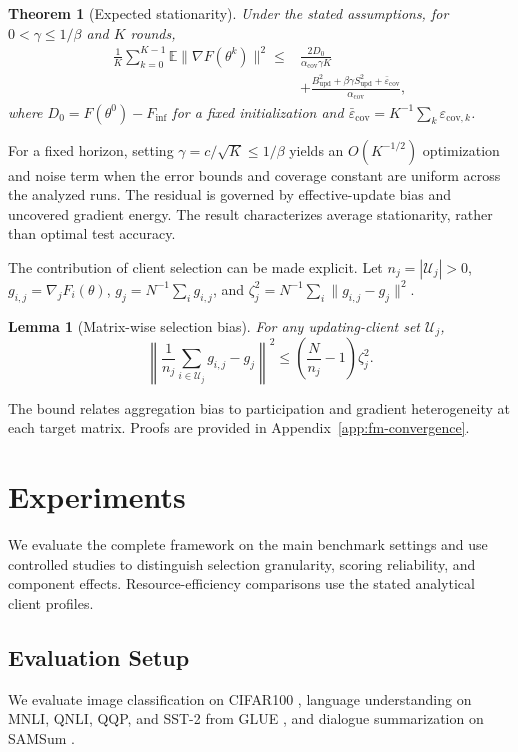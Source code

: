 \documentclass[10pt,conference,letterpaper]{IEEEtran}
\newtheorem{lemma}{Lemma}
\newtheorem{theorem}{Theorem}
\begin{document}
\begin{theorem}[Expected stationarity]
\label{thm:fm-stationarity}
Under the stated assumptions, for $0<\gamma\le1/\beta$ and $K$ rounds,
\begin{align}
 \frac1K\sum_{k=0}^{K-1}\mathbb E\|\nabla F(\theta^k)\|^2
 \le{}&\frac{2D_0}{\alpha_{\mathrm{cov}}\gamma K}\\
 &+\frac{B_{\mathrm{upd}}^2+\beta\gamma S_{\mathrm{upd}}^2
              +\bar\varepsilon_{\mathrm{cov}}}{\alpha_{\mathrm{cov}}},\nonumber
\end{align}
where $D_0=F(\theta^0)-F_{\inf}$ for a fixed initialization and
$\bar\varepsilon_{\mathrm{cov}}=K^{-1}\sum_k\varepsilon_{\mathrm{cov},k}$.
\end{theorem}
For a fixed horizon, setting $\gamma=c/\sqrt K\le1/\beta$ yields an $O(K^{-1/2})$ optimization and noise term when the error bounds and coverage constant are uniform across the analyzed runs. The residual is governed by effective-update bias and uncovered gradient energy. The result characterizes average stationarity, rather than optimal test accuracy.

The contribution of client selection can be made explicit. Let $n_j=|\mathcal U_j|>0$, $g_{i,j}=\nabla_jF_i(\theta)$, $g_j=N^{-1}\sum_i g_{i,j}$, and $\zeta_j^2=N^{-1}\sum_i\|g_{i,j}-g_j\|^2$.
\begin{lemma}[Matrix-wise selection bias]
\label{lem:fm-selection-bias}
For any updating-client set $\mathcal U_j$,
\begin{equation}
 \left\|\frac1{n_j}\sum_{i\in\mathcal U_j}g_{i,j}-g_j\right\|^2
 \le\left(\frac N{n_j}-1\right)\zeta_j^2.
\end{equation}
\end{lemma}
The bound relates aggregation bias to participation and gradient heterogeneity at each target matrix. Proofs are provided in Appendix~\ref{app:fm-convergence}.



\section{Experiments}\label{Sec.evaluation}
We evaluate the complete framework on the main benchmark settings and use controlled studies to distinguish selection granularity, scoring reliability, and component effects. Resource-efficiency comparisons use the stated analytical client profiles. 

\subsection{Evaluation Setup}
We evaluate image classification on CIFAR100 \cite{krizhevsky2009cifar}, language understanding on MNLI, QNLI, QQP, and SST-2 from GLUE \cite{wang2019glue}, and dialogue summarization on SAMSum \cite{gliwa2019samsum}.
\end{document}
